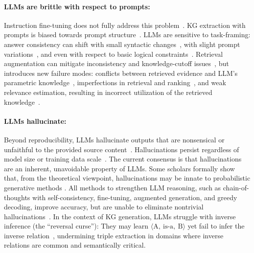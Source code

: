\documentclass[10pt]{article}
\begin{document}
\paragraph{LLMs are brittle with respect to prompts:} Instruction fine-tuning does not fully address this problem~\cite{natureZhou2024}. KG extraction with prompts is biased towards prompt structure~\cite{cao-2021-knowledgeable}. LLMs are sensitive to task-framing: answer consistency can shift with small syntactic changes~\cite{hagstrom-etal-2023-effect}, with slight prompt variations~\cite{mousavi-etal-2024-dyknow, wang2024astute}, and even with respect to basic logical constraints~\cite{ghosh2025logical}. Retrieval augmentation can mitigate inconsistency and knowledge-cutoff issues~\cite{shuster-etal-2021-rag}, but introduces new failure modes: conflicts between retrieved evidence and LLM's parametric knowledge~\cite{DBLP:conf/aaai/0013XXZJC0W25, zeng-etal-2025-towards}, imperfections in retrieval and ranking~\cite{jin-etal-2024-bider}, and weak relevance estimation, resulting in incorrect utilization of the retrieved knowledge~\cite{wang2024rear}.
  
\paragraph{LLMs hallucinate:} Beyond reproducibility, LLMs hallucinate outputs that are nonsensical or unfaithful to the provided source content~\cite{10.1145/3571730, zhang2024knowledgeovershadowing, li-etal-2024-dawn}. Hallucinations persist regardless of model size or training data scale~\cite{shuster-etal-2021-rag}. The current consensus is that hallucinations are an inherent, unavoidable property of LLMs. Some scholars formally show that, from the theoretical viewpoint, hallucinations may be innate to probabilistic generative methods \cite{xu2025hallucinationinevitable}. All methods to strengthen LLM reasoning, such as chain-of-thoughts with self-consistency, fine-tuning, augmented generation, and greedy decoding, improve accuracy, but are unable to eliminate nontrivial hallucinations~\cite{kim2025medicalhallucinations}. In the context of KG generation, LLMs struggle with inverse inference (the ``reversal curse''): They may learn $\langle \text{A},\ \text{is-a},\ \text{B}\rangle$ yet fail to infer the inverse relation~\cite{2024reversalcurse}, undermining triple extraction in domains where inverse relations are common and semantically critical. 
\end{document}
